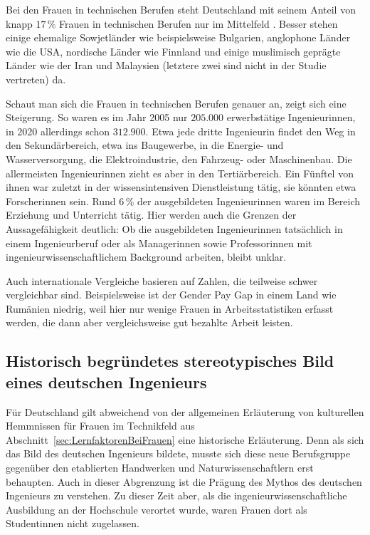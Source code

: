 \documentclass[a4paper, 12 pt]{IEEEtran}
\begin{document}
Bei den Frauen in technischen Berufen steht Deutschland mit seinem Anteil von knapp $17\,\%$ Frauen in technischen Berufen nur im Mittelfeld \cite{Honeypot.2018}. Besser stehen einige ehemalige Sowjetländer wie beispielsweise Bulgarien, anglophone Länder wie die USA, nordische Länder wie Finnland und einige muslimisch geprägte Länder wie der Iran und Malaysien (letztere zwei sind nicht in der Studie vertreten) da. \cite{Honeypot.2018} 

Schaut man sich die Frauen in technischen Berufen genauer an, zeigt sich eine Steigerung. So waren es im Jahr 2005 nur $205.000$ erwerbstätige Ingenieurinnen, in 2020 allerdings schon $312.900$.
Etwa jede dritte Ingenieurin findet den Weg in den Sekundärbereich, etwa ins Baugewerbe, in die Energie- und Wasserversorgung, die Elektroindustrie, den Fahrzeug- oder Maschinenbau. Die allermeisten Ingenieurinnen zieht es aber in den Tertiärbereich. Ein Fünftel von ihnen war zuletzt in der wissensintensiven Dienstleistung tätig, sie könnten etwa Forscherinnen sein. Rund $6\,\%$ der ausgebildeten Ingenieurinnen waren im Bereich Erziehung und Unterricht tätig. Hier werden auch die Grenzen der Aussagefähigkeit deutlich: Ob die ausgebildeten Ingenieurinnen tatsächlich in einem Ingenieurberuf oder als Managerinnen sowie Professorinnen mit ingenieurwissenschaftlichem Background arbeiten, bleibt unklar.

Auch internationale Vergleiche basieren auf Zahlen, die teilweise schwer vergleichbar sind. Beispielsweise ist der Gender Pay Gap in einem Land wie Rumänien niedrig, weil hier nur wenige Frauen in Arbeitsstatistiken erfasst werden, die dann aber vergleichsweise gut bezahlte Arbeit leisten.

\subsection{Historisch begründetes stereotypisches Bild eines deutschen Ingenieurs}
Für Deutschland gilt abweichend von der allgemeinen Erläuterung von kulturellen Hemmnissen für Frauen im Technikfeld aus Abschnitt~\ref{sec:LernfaktorenBeiFrauen} eine historische Erläuterung. Denn als sich das Bild des deutschen Ingenieurs bildete, musste sich diese neue Berufsgruppe gegenüber den etablierten Handwerken und Naturwissenschaftlern erst behaupten. Auch in dieser Abgrenzung ist die Prägung des Mythos des deutschen Ingenieurs zu verstehen. Zu dieser Zeit aber, als die ingenieurwissenschaftliche Ausbildung an der Hochschule verortet wurde, waren Frauen dort als Studentinnen nicht zugelassen. 
\end{document}
